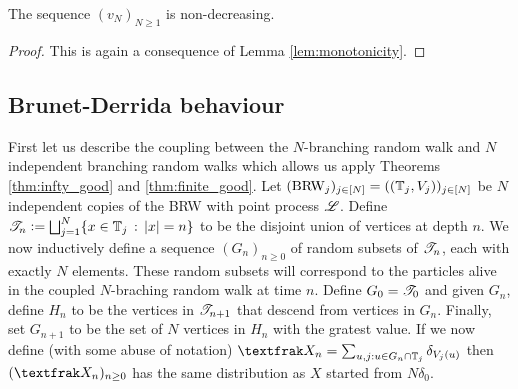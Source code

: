 \begin{proposition}\label{prop:increasing_speed}
The sequence $(v_N)_{N \geq 1}$ is non-decreasing. 
\end{proposition}
\begin{proof}
This is again a consequence of Lemma \ref{lem:monotonicity}. 
\end{proof}






\subsection{Brunet-Derrida behaviour}\label{sec:ExpTails_BrunDer}
First let us describe the coupling between the $N$-branching random walk and $N$ independent branching random walks which allows us apply Theorems \ref{thm:infty_good} and \ref{thm:finite_good}. Let $(\text{BRW}_j)_{j \in [N]} = ((\mathbb{T}_j, V_j))_{j \in [N]}$ be $N$ independent copies of the BRW with point process $\mathscr{L}$. Define $\mathscr{T}_n \vcentcolon= \bigsqcup_{j=1}^N \{ x \in \mathbb{T}_j \,:\, |x|=n \}$ to be the disjoint union of vertices at depth $n$. We now inductively define a sequence $(G_n)_{n \geq 0}$ of random subsets of $\mathscr{T}_n$, each with exactly $N$ elements. These random subsets will correspond to the particles alive in the coupled $N$-braching random walk at time $n$. Define $G_0 = \mathscr{T}_0$ and given $G_n$, define $H_n$ to be the vertices in $\mathscr{T}_{n+1}$ that descend from vertices in $G_n$. Finally, set $G_{n+1}$ to be the set of $N$ vertices in $H_n$ with the gratest value. If we now define (with some abuse of notation) $\frak{X}_n = \sum_{u,j : u \in G_n \cap \bb{T}_j} \delta_{V_j(u)}$ then $(\frak{X}_n)_{n \geq 0}$ has the same distribution as $X$ started from $N \delta_0$. 

